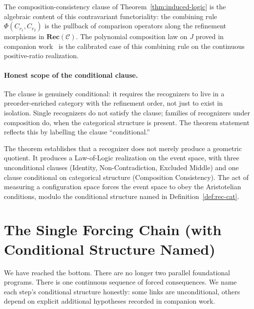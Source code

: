 \documentclass[11pt,a4paper]{article}
\theoremstyle{definition}
\theoremstyle{remark}
\begin{document}
The composition-consistency clause of Theorem~\ref{thm:induced-logic}
is the algebraic content of this contravariant functoriality: the
combining rule $\Phi(C_{r_1}, C_{r_2})$ is the pullback of comparison
operators along the refinement morphisms in $\mathbf{Rec}(\mathcal{C})$.
The polynomial composition law on $J$ proved in companion
work~\cite{Washburn2026LogicFE} is the calibrated case of this
combining rule on the continuous positive-ratio realization.

\paragraph{Honest scope of the conditional clause.} The clause is
genuinely conditional: it requires the recognizers to live in a
preorder-enriched category with the refinement order, not just to
exist in isolation. Single recognizers do not satisfy the clause;
families of recognizers under composition do, when the categorical
structure is present. The theorem statement reflects this by
labelling the clause ``conditional.''

The theorem establishes that a recognizer does not merely produce a
geometric quotient. It produces a Law-of-Logic realization on the
event space, with three unconditional clauses (Identity,
Non-Contradiction, Excluded Middle) and one clause conditional on
categorical structure (Composition Consistency). The act of
measuring a configuration space forces the event space to obey the
Aristotelian conditions, modulo the conditional structure named in
Definition~\ref{def:rec-cat}.

\section{The Single Forcing Chain (with Conditional Structure Named)}

We have reached the bottom. There are no longer two parallel
foundational programs. There is one continuous sequence of forced
consequences. We name each step's conditional structure honestly:
some links are unconditional, others depend on explicit additional
hypotheses recorded in companion work.
\end{document}

